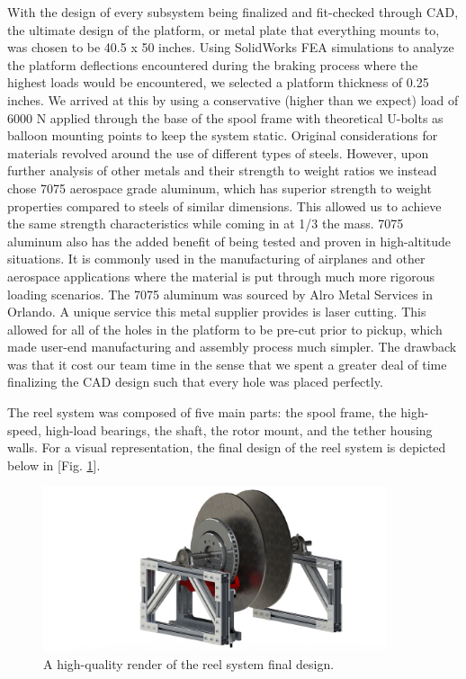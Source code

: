With the design of every subsystem being finalized and fit-checked through CAD, the ultimate design of the platform, or metal plate that everything mounts to, was chosen to be 40.5 x 50 inches. Using SolidWorks FEA simulations to analyze the platform deflections encountered during the braking process where the highest loads would be encountered, we selected a platform thickness of 0.25 inches. We arrived at this by using a conservative (higher than we expect) load of 6000 N applied through the base of the spool frame with theoretical U-bolts as balloon mounting points to keep the system static. Original considerations for materials revolved around the use of different types of steels. However, upon further analysis of other metals and their strength to weight ratios we instead chose 7075 aerospace grade aluminum, which has superior strength to weight properties compared to steels of similar dimensions. This allowed us to achieve the same strength characteristics while coming in at 1/3 the mass. 7075 aluminum also has the added benefit of being tested and proven in high-altitude situations. It is commonly used in the manufacturing of airplanes and other aerospace applications where the material is put through much more rigorous loading scenarios. The 7075 aluminum was sourced by Alro Metal Services in Orlando. A unique service this metal supplier provides is laser cutting. This allowed for all of the holes in the platform to be pre-cut prior to pickup, which made user-end manufacturing and assembly process much simpler. The drawback was that it cost our team time in the sense that we spent a greater deal of time finalizing the CAD design such that every hole was placed perfectly. 

The reel system was composed of five main parts: the spool frame, the high-speed, high-load bearings, the shaft, the rotor mount, and the tether housing walls. For a visual representation, the final design of the reel system is depicted below in [Fig. \ref{fig:UnitReelHiQual}]. 

\begin{figure}[ht]
  \centering
  \includegraphics[width=0.9\textwidth]{TUMBR/UnitReelHiQual.png}
  \caption{\label{fig:UnitReelHiQual}A high-quality render of the reel system final design.}
\end{figure}


